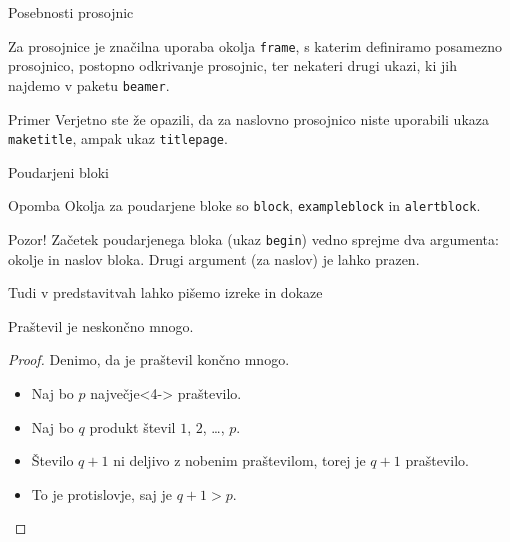 \begin{frame}{Posebnosti prosojnic}

	Za prosojnice je značilna uporaba okolja \texttt{frame},
	s katerim definiramo posamezno prosojnico,\pause
	postopno odkrivanje prosojnic,\pause
	ter nekateri drugi ukazi, ki jih najdemo v paketu \texttt{beamer}.\pause
	\begin{exampleblock}{Primer}
		Verjetno ste že opazili, da za naslovno prosojnico niste uporabili
		ukaza \texttt{maketitle}, ampak ukaz \texttt{titlepage}.
	\end{exampleblock}
\end{frame}

\begin{frame}{Poudarjeni bloki}

\begin{block}{Opomba}
		Okolja za poudarjene bloke so \texttt{block}, \texttt{exampleblock} in \texttt{alertblock}.
\end{block}

\begin{alertblock}{Pozor!}
		Začetek poudarjenega bloka (ukaz \texttt{begin}) vedno sprejme 
		dva argumenta: okolje in naslov bloka.
		Drugi argument (za naslov) je lahko prazen. 
\end{alertblock}
\end{frame}

\begin{frame}{Tudi v predstavitvah lahko pišemo izreke in dokaze}

	\begin{izrek}
	   Praštevil je neskončno mnogo.
	\end{izrek}
	\begin{proof}
	   Denimo, da je praštevil končno mnogo.
	   \begin{itemize}
		  \item<1->Naj bo \(p\) \alert{največje}<4-> praštevilo.
		  \item<2->Naj bo \(q\) produkt števil \(1\), \(2\), \ldots, \(p\).
		  \item<3-> Število \(q+1\) ni deljivo z nobenim praštevilom, torej je \(q+1\) praštevilo.
		  \item<4-> To je protislovje, saj je \(q+1>p\). \qedhere
	   \end{itemize}
	\end{proof}
 \end{frame}
 
